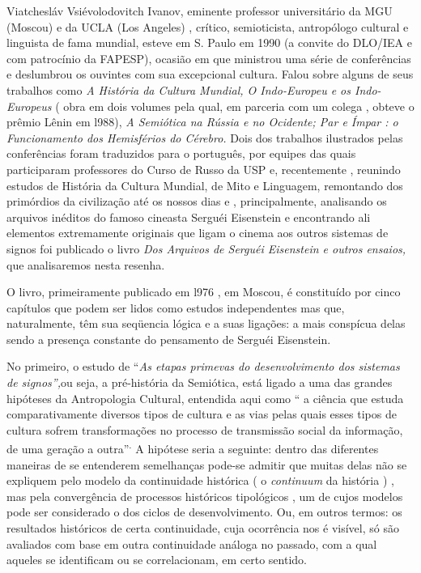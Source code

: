 Viatchesláv Vsiévolodovitch Ivanov, eminente professor universitário da
MGU (Moscou) e da UCLA (Los Angeles) , crítico, semioticista,
antropólogo cultural e linguista de fama mundial, esteve em S. Paulo em
1990 (a convite do DLO/IEA e com patrocínio da FAPESP), ocasião em que
ministrou uma série de conferências e deslumbrou os ouvintes com sua
excepcional cultura. Falou sobre alguns de seus trabalhos como \emph{A
História da Cultura Mundial, O Indo-Europeu e os Indo-Europeus} ( obra
em dois volumes pela qual, em parceria com um colega , obteve o prêmio
Lênin em l988), \emph{A Semiótica na Rússia e no Ocidente; Par e Ímpar :
o Funcionamento dos Hemisférios do Cérebro.} Dois dos trabalhos
ilustrados pelas conferências foram traduzidos para o português, por
equipes das quais participaram professores do Curso de Russo da USP e,
recentemente , reunindo estudos de História da Cultura Mundial, de Mito
e Linguagem, remontando dos primórdios da civilização até os nossos dias
e , principalmente, analisando os arquivos inéditos do famoso cineasta
Serguéi Eisenstein e encontrando ali elementos extremamente originais
que ligam o cinema aos outros sistemas de signos foi publicado o livro
\emph{Dos Arquivos de Serguéi Eisenstein e outros ensaios,} que
analisaremos nesta resenha.

O livro, primeiramente publicado em l976 , em Moscou, é constituído por
cinco capítulos que podem ser lidos como estudos independentes mas que,
naturalmente, têm sua seqüencia lógica e a suas ligações: a mais
conspícua delas sendo a presença constante do pensamento de Serguéi
Eisenstein.

No primeiro, o estudo de ``\emph{As etapas primevas do desenvolvimento
dos sistemas de signos'',}ou seja, a pré-história da Semiótica, está
ligado a uma das grandes hipóteses da Antropologia Cultural, entendida
aqui como `` a ciência que estuda comparativamente diversos tipos de
cultura e as vias pelas quais esses tipos de cultura sofrem
transformações no processo de transmissão social da informação, de uma
geração a outra''\textsuperscript{.} A hipótese seria a seguinte: dentro
das diferentes maneiras de se entenderem semelhanças pode-se admitir que
muitas delas não se expliquem pelo modelo da continuidade histórica ( o
\emph{continuum} da história ) , mas pela convergência de processos
históricos tipológicos , um de cujos modelos pode ser considerado o dos
ciclos de desenvolvimento. Ou, em outros termos: os resultados
históricos de certa continuidade, cuja ocorrência nos é visível, só são
avaliados com base em outra continuidade análoga no passado, com a qual
aqueles se identificam ou se correlacionam, em certo sentido.

